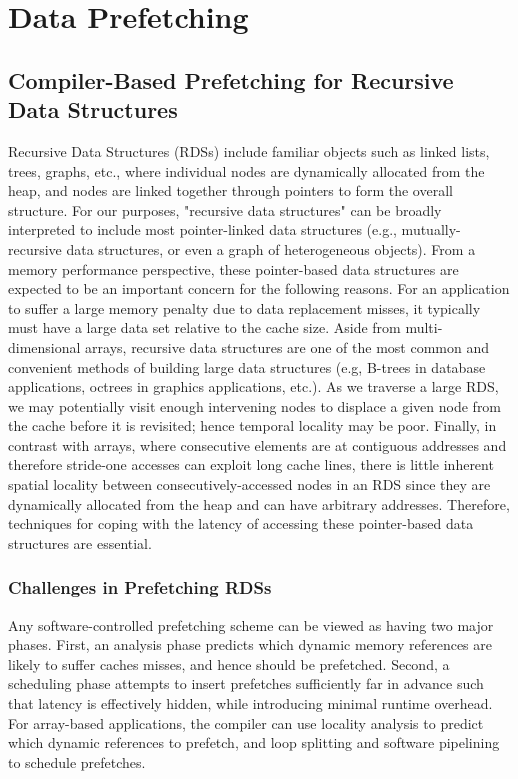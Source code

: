 \newpage

\section{Data Prefetching}
\subsection{Compiler-Based Prefetching for Recursive Data Structures\cite{luk1996compiler}}

Recursive Data Structures (RDSs) include familiar objects
such as linked lists, trees, graphs, etc., where individual nodes
are dynamically allocated from the heap, and nodes are linked
together through pointers to form the overall structure. For
our purposes, "recursive data structures" can be broadly interpreted to include most pointer-linked data structures (e.g.,
mutually-recursive data structures, or even a graph of heterogeneous objects). From a memory performance perspective, these
pointer-based data structures are expected to be an important
concern for the following reasons. For an application to suffer a large memory penalty due to data replacement misses, it
typically must have a large data set relative to the cache size.
Aside from multi-dimensional arrays, recursive data structures
are one of the most common and convenient methods of building
large data structures (e.g, B-trees in database applications, octrees in graphics applications, etc.). As we traverse a large RDS,
we may potentially visit enough intervening nodes to displace a
given node from the cache before it is revisited; hence temporal
locality may be poor. Finally, in contrast with arrays, where
consecutive elements are at contiguous addresses and therefore
stride-one accesses can exploit long cache lines, there is little inherent spatial locality between consecutively-accessed nodes in
an RDS since they are dynamically allocated from the heap and
can have arbitrary addresses. Therefore, techniques for coping
with the latency of accessing these pointer-based data structures
are essential.



\subsubsection{Challenges in Prefetching RDSs }


Any software-controlled prefetching scheme can be viewed as having two major phases. First, an analysis phase predicts which dynamic memory references are likely to suffer caches misses, and
hence should be prefetched. Second, a scheduling phase attempts
to insert prefetches sufficiently far in advance such that latency is
effectively hidden, while introducing minimal runtime overhead.
For array-based applications, the compiler can use locality analysis to predict which dynamic references to prefetch, and loop
splitting and software pipelining to schedule prefetches.

